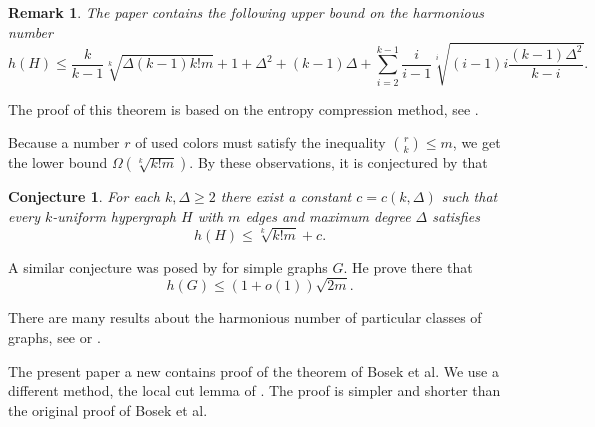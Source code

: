 \documentclass{article}
\newtheorem{conjecture}{Conjecture}
\newtheorem{remark}{Remark}
\begin{document}
        \begin{remark}
        The paper \cite{Bosek} contains the following upper bound on the harmonious number 
        \[h(H)\leq\frac{k}{k-1}\sqrt[k]{\Delta(k-1)k!m}+1+\Delta^2+(k-1)\Delta+\sum_{i=2}^{k-1}\frac{i}{i-1}\sqrt[i]{(i-1)i\frac{(k-1)\Delta^2}{k-i}}.\]
        \end{remark}
        
	The proof of this theorem is based on the entropy compression method, see \cite{GrytczukKM, EsperetP}.
	
	Because a number $r$ of used colors must satisfy the inequality $\binom{r}{k}\leq m$, we get the lower bound $\Omega(\sqrt[k]{k!m})$. By these observations, it is conjectured by \cite{Bosek} that 
	\begin{conjecture}
		For each $k,\Delta\geq 2$ there exist a constant $c=c(k,\Delta)$ such  that every $k$-uniform hypergraph $H$ with $m$ edges and maximum degree $\Delta$ satisfies \[h(H)\leq \sqrt[k]{k!m}+c.\]
	\end{conjecture}
	A similar conjecture was posed by \cite{EdwardsDegree} for simple graphs $G$. He prove there that \[h(G)\leq(1+o(1))\sqrt{2m}.\]
	
	There are many results about the harmonious number of particular classes of graphs, see \cite{Aflaki, Akbari, Edwards1, Edwards2, Edwards0, Edwards3, Krasikov} or \cite{Aigner, Balister1, Balister2, Bazgan, Burris}.
 
	The present paper a new contains proof of the theorem of Bosek et al. We use a different method, the local cut lemma of \cite{Bernshteyn, Bernshteyn2}. The proof is simpler and shorter than the original proof of Bosek et al.
	
\end{document}
